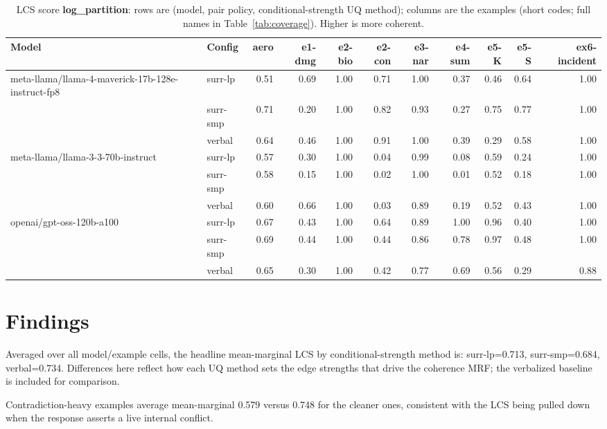 \documentclass[11pt]{article}
\begin{document}
\begin{table}[htbp]
\centering
\footnotesize
\setlength{\tabcolsep}{3.5pt}
\caption{LCS score \textbf{log\_partition}: rows are (model, pair policy, conditional-strength UQ method); columns are the examples (short codes; full names in Table~\ref{tab:coverage}). Higher is more coherent.}
\label{tab:log-partition}
\begin{tabular}{llrrrrrrrrr}
\toprule
\textbf{Model} & \textbf{Config} & \textbf{aero} & \textbf{e1-dmg} & \textbf{e2-bio} & \textbf{e2-con} & \textbf{e3-nar} & \textbf{e4-sum} & \textbf{e5-K} & \textbf{e5-S} & \textbf{ex6-incident} \\
\midrule
meta-llama/llama-4-maverick-17b-128e-instruct-fp8 & surr-lp & 0.51 & 0.69 & 1.00 & 0.71 & 1.00 & 0.37 & 0.46 & 0.64 & 1.00 \\
 & surr-smp & 0.71 & 0.20 & 1.00 & 0.82 & 0.93 & 0.27 & 0.75 & 0.77 & 1.00 \\
 & verbal & 0.64 & 0.46 & 1.00 & 0.91 & 1.00 & 0.39 & 0.29 & 0.58 & 1.00 \\
\midrule
meta-llama/llama-3-3-70b-instruct & surr-lp & 0.57 & 0.30 & 1.00 & 0.04 & 0.99 & 0.08 & 0.59 & 0.24 & 1.00 \\
 & surr-smp & 0.58 & 0.15 & 1.00 & 0.02 & 1.00 & 0.01 & 0.52 & 0.18 & 1.00 \\
 & verbal & 0.60 & 0.66 & 1.00 & 0.03 & 0.89 & 0.19 & 0.52 & 0.43 & 1.00 \\
\midrule
openai/gpt-oss-120b-a100 & surr-lp & 0.67 & 0.43 & 1.00 & 0.64 & 0.89 & 1.00 & 0.96 & 0.40 & 1.00 \\
 & surr-smp & 0.69 & 0.44 & 1.00 & 0.44 & 0.86 & 0.78 & 0.97 & 0.48 & 1.00 \\
 & verbal & 0.65 & 0.30 & 1.00 & 0.42 & 0.77 & 0.69 & 0.56 & 0.29 & 0.88 \\
\bottomrule
\end{tabular}
\end{table}


\section{Findings}

Averaged over all model/example cells, the headline mean-marginal LCS by conditional-strength method is: surr-lp=0.713, surr-smp=0.684, verbal=0.734. Differences here reflect how each UQ method sets the edge strengths that drive the coherence MRF; the verbalized baseline is included for comparison.

Contradiction-heavy examples average mean-marginal 0.579 versus 0.748 for the cleaner ones, consistent with the LCS being pulled down when the response asserts a live internal conflict.
\end{document}
